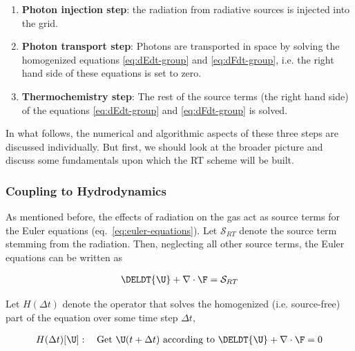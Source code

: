 \begin{enumerate}

\item \textbf{Photon injection step}: the radiation from radiative sources is injected into the
grid.

\item \textbf{Photon transport step}: Photons are transported in space by solving the homogenized
equations \ref{eq:dEdt-group} and \ref{eq:dFdt-group}, i.e. the right hand side of these equations
is set to zero.

\item \textbf{Thermochemistry step}: The rest of the source terms (the right hand side) of the
equations \ref{eq:dEdt-group} and \ref{eq:dFdt-group} is solved.
\end{enumerate}

In what follows, the numerical and algorithmic aspects of these three steps are discussed
individually. But first, we should look at the broader picture and discuss some fundamentals upon
which the RT scheme will be built.









\subsubsection{Coupling to Hydrodynamics}

As mentioned before, the effects of radiation on the gas act as source terms for the Euler equations
(eq.~\ref{eq:euler-equations}). Let $\mathcal{S}_{RT}$ denote the source term stemming from the
radiation. Then, neglecting all other source terms, the Euler equations can be written as

\begin{align}
    \DELDT{\U} + \nabla \cdot \F = \mathcal{S}_{RT}
\end{align}

Let $H(\Delta t)$ denote the operator that solves the homogenized (i.e. source-free) part of the
equation over some time step $\Delta t$,

\begin{align}
  H(\Delta t) [\U]: \quad \text{Get }\U(t+\Delta t) \text{ according to } \DELDT{\U} + \nabla \cdot
\F = 0
\end{align}


